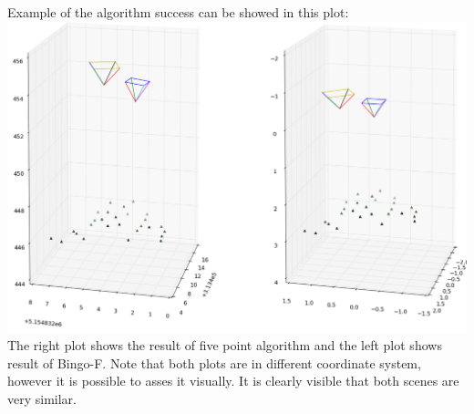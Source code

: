 \documentclass[a4paper,12pt]{report}
\begin{document}
Example of the algorithm success can be showed in this plot:
\includegraphics[scale=0.4]{figures/rel_or_576_598.png}
The right plot shows the result of five point algorithm and the left plot shows result of Bingo-F. Note that both 
plots are in different coordinate system, however it is possible to asses it visually. It is clearly visible
that both scenes are very similar.
\end{document}
